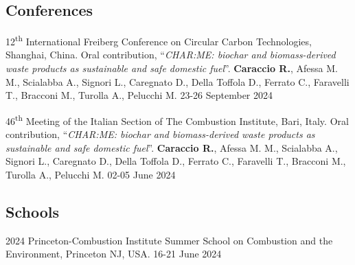 \subsection{Conferences}
\begin{etaremune}
    \item
        12\textsuperscript{th} International Freiberg Conference on Circular Carbon Technologies, Shanghai, China. Oral contribution,
        ``{\it CHAR:ME: biochar and biomass-derived waste products as sustainable and safe domestic fuel}''. 
        {\bf Caraccio R.},  Afessa M. M., Scialabba A., Signori L., Caregnato D., Della Toffola D., Ferrato C., Faravelli T., Bracconi M., Turolla A., Pelucchi M. 
        23-26 September 2024

    \item
        46\textsuperscript{th} Meeting of the Italian Section of The Combustion Institute, 
        Bari, Italy. Oral contribution, 
        ``{\it CHAR:ME: biochar and biomass-derived waste products as sustainable and safe domestic fuel}''. 
        {\bf Caraccio R.},  Afessa M. M., Scialabba A., Signori L., Caregnato D., Della Toffola D., Ferrato C., Faravelli T., Bracconi M., Turolla A., Pelucchi M. 
        02-05 June 2024
\end{etaremune}

\subsection{Schools}
\begin{etaremune}
    \item 
         2024 Princeton-Combustion Institute Summer School on Combustion and the Environment, Princeton NJ, USA. 16-21 June 2024


\end{etaremune}


